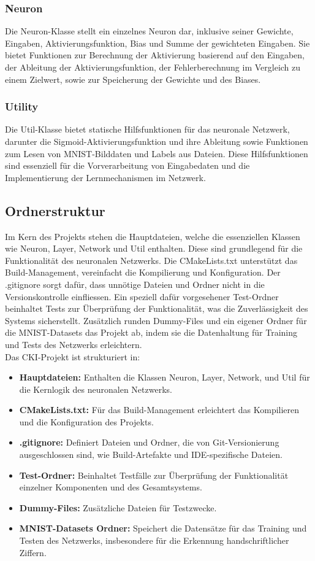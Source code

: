 \subsubsection{Neuron}
\label{sec:RealNeuron}
Die Neuron-Klasse stellt ein einzelnes Neuron dar, inklusive seiner Gewichte, Eingaben, Aktivierungsfunktion, Bias und Summe der gewichteten Eingaben. Sie bietet Funktionen zur Berechnung der Aktivierung basierend auf den Eingaben, der Ableitung der Aktivierungsfunktion, der Fehlerberechnung im Vergleich zu einem Zielwert, sowie zur Speicherung der Gewichte und des Biases. 
\subsubsection{Utility}
\label{sec:RealUtility}
Die Util-Klasse bietet statische Hilfsfunktionen für das neuronale Netzwerk, darunter die Sigmoid-Aktivierungsfunktion und ihre Ableitung sowie Funktionen zum Lesen von MNIST-Bilddaten und Labels aus Dateien. Diese Hilfsfunktionen sind essenziell für die Vorverarbeitung von Eingabedaten und die Implementierung der Lernmechanismen im Netzwerk. 
\subsection{Ordnerstruktur}
\label{sec:RealOrdnerstruktur}
Im Kern des Projekts stehen die Hauptdateien, welche die essenziellen Klassen wie Neuron, Layer, Network und Util enthalten. Diese sind grundlegend für die Funktionalität des neuronalen Netzwerks. Die CMakeLists.txt unterstützt das Build-Management, vereinfacht die Kompilierung und Konfiguration. Der .gitignore sorgt dafür, dass unnötige Dateien und Ordner nicht in die Versionskontrolle einfliessen. Ein speziell dafür vorgesehener Test-Ordner beinhaltet Tests zur Überprüfung der Funktionalität, was die Zuverlässigkeit des Systems sicherstellt. Zusätzlich runden Dummy-Files und ein eigener Ordner für die MNIST-Datasets das Projekt ab, indem sie die Datenhaltung für Training und Tests des Netzwerks erleichtern. 
\\
Das CKI-Projekt ist strukturiert in:
\begin{itemize}
	\item \textbf{Hauptdateien:} 
	Enthalten die Klassen Neuron, Layer, Network, und Util für die Kernlogik des neuronalen Netzwerks.
  \item \textbf{CMakeLists.txt:} 
	Für das Build-Management erleichtert das Kompilieren und die Konfiguration des Projekts.
  \item \textbf{.gitignore:} 
	Definiert Dateien und Ordner, die von Git-Versionierung ausgeschlossen sind, wie Build-Artefakte und IDE-spezifische Dateien.
  \item \textbf{Test-Ordner:} 
	Beinhaltet Testfälle zur Überprüfung der Funktionalität einzelner Komponenten und des Gesamtsystems.
	\item \textbf{Dummy-Files:} 
	Zusätzliche Dateien für Testzwecke.
	\item \textbf{MNIST-Datasets Ordner:} 
	Speichert die Datensätze für das Training und Testen des Netzwerks, insbesondere für die Erkennung handschriftlicher Ziffern.
\end{itemize}

